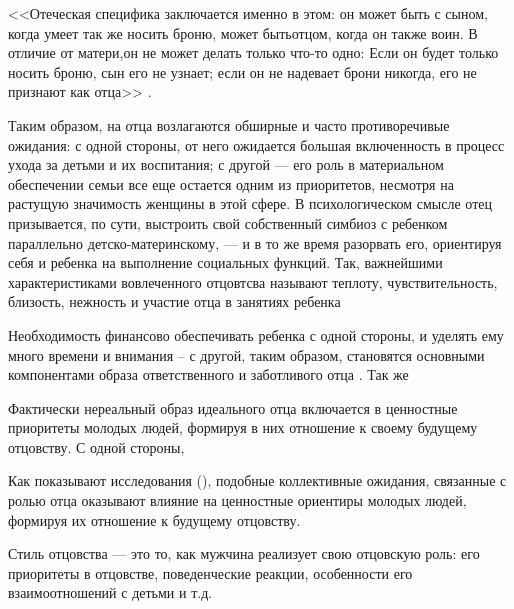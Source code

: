 \documentclass{../../common/thesisbyxetex}
\begin{document}
<<Отеческая специфика заключается именно в этом: он может быть с сыном, когда умеет так же носить 
броню, может бытьотцом, когда он также воин. В отличие от матери,он не может делать только 
что-то одно: Если он будет только носить броню, сын его не узнает; если он не надевает брони 
никогда, его не признают как отца>> \cite[287]{zo}.



Таким образом, на отца возлагаются обширные и часто противоречивые ожидания: с одной стороны, от 
него ожидается большая включенность в процесс ухода за детьми и их воспитания; с другой --- его 
роль в материальном обеспечении семьи все еще остается одним из приоритетов, несмотря на растущую 
значимость женщины в этой сфере. В психологическом смысле отец призывается, по сути, выстроить свой 
собственный симбиоз с ребенком параллельно детско-материнскому, --- и в то же время разорвать его, 
ориентируя себя и ребенка на выполнение социальных функций. Так, важнейшими характеристиками 
вовлеченного отцовтсва называют теплоту, чувствительность, близость, нежность и участие отца в 
занятиях ребенка \cite[129]{f21}

Необходимость финансово обеспечивать ребенка с одной стороны, и уделять ему много времени и 
внимания -- с другой, таким образом, становятся основными компонентами образа ответственного и 
заботливого отца \cite[129]{f21}. Так же 




Фактически нереальный образ идеального отца включается в ценностные приоритеты молодых людей, 
формируя в них отношение к своему будущему отцовству. С одной стороны,
 
Как показывают исследования (\cite{imaf}), подобные коллективные ожидания, связанные с ролью отца 
оказывают влияние на ценностные ориентиры молодых людей, формируя их отношение к будущему 
отцовству. 






Стиль отцовства --- это то, как мужчина реализует свою отцовскую роль: его приоритеты в отцовстве, 
поведенческие реакции, особенности его взаимоотношений с детьми и т.д.
\end{document}
